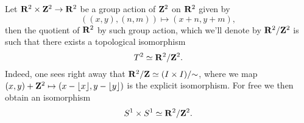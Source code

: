 \begin{example}[Torus \(T^2\)]
    Let \(\mathbf{R}^2 \times \mathbf{Z}^2 \to \mathbf{R}^2\) be a group action of \(\mathbf{Z}^2\) on \(\mathbf{R}^2\)
    given by
    \[
        ((x, y), (n, m)) \mapsto (x + n, y + m),
    \]
    then the quotient of \(\mathbf{R}^2\) by such group action, which we'll denote by
    \(\mathbf{R}^2/\mathbf{Z}^2\) is such that there exists a topological isomorphism
    \[
        T^2 \simeq \mathbf{R}^2/\mathbf{Z}^2.
    \]
    Indeed, one sees right away that \(\mathbf{R}^2/\mathbf{Z} \simeq (I \times I)/{\sim}\), where we
    map \((x, y) + \mathbf{Z}^2 \mapsto (x - \lfloor x \rfloor, y - \lfloor y \rfloor)\) is
    the explicit isomorphism. For free we then obtain an isomorphism
    \[
        S^1 \times S^1 \simeq \mathbf{R}^2/\mathbf{Z}^2.
    \]
\end{example}




